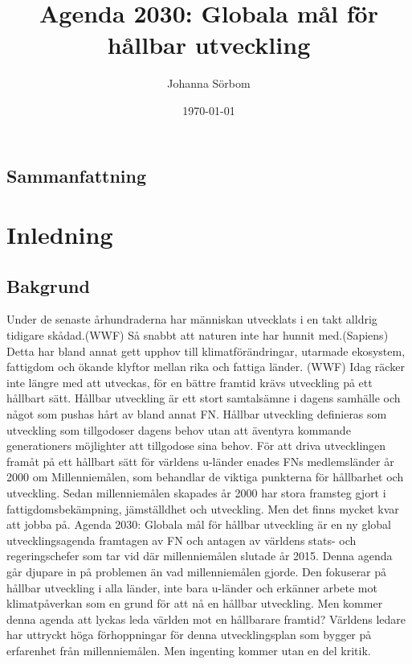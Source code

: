 \documentclass{report}
\title{Agenda 2030: Globala mål för hållbar utveckling}
\date{\today}
\author{Johanna Sörbom}
\begin{document}
\maketitle
\newpage
\begin{titlepage}
\section*{Sammanfattning}
\newpage
\tableofcontents
\end{titlepage}
\newpage
{}
\section{Inledning}
\subsection{Bakgrund}
Under de senaste århundraderna har människan utvecklats i en takt alldrig tidigare skådad.(WWF) Så snabbt att naturen inte har hunnit med.(Sapiens) Detta har bland annat gett upphov till klimatförändringar, utarmade ekosystem, fattigdom och ökande klyftor mellan rika och fattiga länder. (WWF) Idag räcker inte längre med att utveckas, för en bättre framtid krävs utveckling på ett hållbart sätt. Hållbar utveckling är ett stort samtalsämne i dagens samhälle och något som pushas hårt av bland annat FN. Hållbar utveckling definieras som utveckling som tillgodoser dagens behov utan att äventyra kommande generationers möjlighter att tillgodose sina behov.\cite{web2030agenda}
För att driva utvecklingen framåt på ett hållbart sätt för världens u-länder enades FNs medlemsländer år 2000 om Millenniemålen, som behandlar de viktiga punkterna för hållbarhet och utveckling.  Sedan millenniemålen skapades år 2000 har stora framsteg gjort i fattigdomsbekämpning, jämställdhet och utveckling. Men det finns mycket kvar att jobba på. \cite{webEuropeanComission}
Agenda 2030: Globala mål för hållbar utveckling är en ny global utvecklingsagenda framtagen av FN och antagen av världens stats- och regeringschefer som tar vid där millenniemålen slutade år 2015. Denna agenda går djupare in på problemen än vad millenniemålen gjorde. Den fokuserar på hållbar utveckling i alla länder, inte bara u-länder och erkänner arbete mot klimatpåverkan som en grund för att nå en hållbar utveckling. Men kommer denna agenda att lyckas leda världen mot en hållbarare framtid? Världens ledare har uttryckt höga förhoppningar för denna utvecklingsplan som bygger på erfarenhet från millenniemålen. Men ingenting kommer utan en del kritik. 
\end{document}
